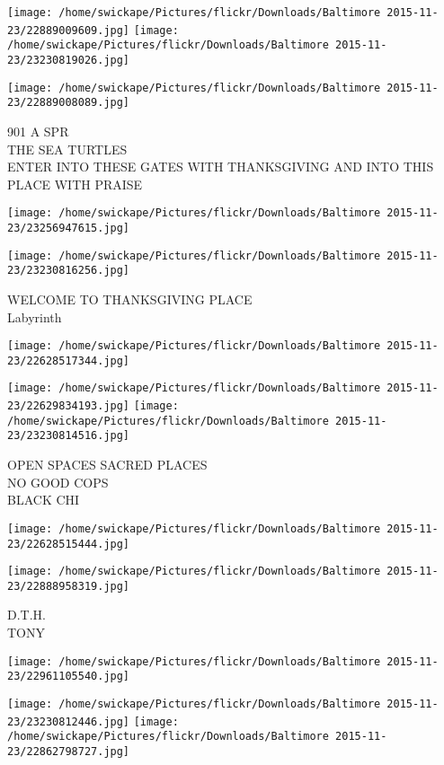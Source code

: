 \documentclass[10pt,letterpaper]{article}
\begin{document}
\texttt{[image: /home/swickape/Pictures/flickr/Downloads/Baltimore 2015-11-23/22889009609.jpg]}
\texttt{[image: /home/swickape/Pictures/flickr/Downloads/Baltimore 2015-11-23/23230819026.jpg]}

\texttt{[image: /home/swickape/Pictures/flickr/Downloads/Baltimore 2015-11-23/22889008089.jpg]}

901 A SPR\\
THE SEA TURTLES\\
ENTER INTO THESE GATES WITH THANKSGIVING AND INTO THIS PLACE WITH PRAISE
\pagebreak

\texttt{[image: /home/swickape/Pictures/flickr/Downloads/Baltimore 2015-11-23/23256947615.jpg]}

\vspace{0.25in}
\texttt{[image: /home/swickape/Pictures/flickr/Downloads/Baltimore 2015-11-23/23230816256.jpg]}

WELCOME TO THANKSGIVING PLACE\\
Labyrinth
\pagebreak

\texttt{[image: /home/swickape/Pictures/flickr/Downloads/Baltimore 2015-11-23/22628517344.jpg]}

\vspace{0.25in}
\texttt{[image: /home/swickape/Pictures/flickr/Downloads/Baltimore 2015-11-23/22629834193.jpg]}
\texttt{[image: /home/swickape/Pictures/flickr/Downloads/Baltimore 2015-11-23/23230814516.jpg]}

OPEN SPACES SACRED PLACES\\
NO GOOD COPS\\
BLACK CHI
\pagebreak

\texttt{[image: /home/swickape/Pictures/flickr/Downloads/Baltimore 2015-11-23/22628515444.jpg]}

\vspace{0.25in}
\texttt{[image: /home/swickape/Pictures/flickr/Downloads/Baltimore 2015-11-23/22888958319.jpg]}

D.T.H.\\
TONY
\pagebreak

\texttt{[image: /home/swickape/Pictures/flickr/Downloads/Baltimore 2015-11-23/22961105540.jpg]}

\vspace{0.25in}
\texttt{[image: /home/swickape/Pictures/flickr/Downloads/Baltimore 2015-11-23/23230812446.jpg]}
\texttt{[image: /home/swickape/Pictures/flickr/Downloads/Baltimore 2015-11-23/22862798727.jpg]}
\end{document}
